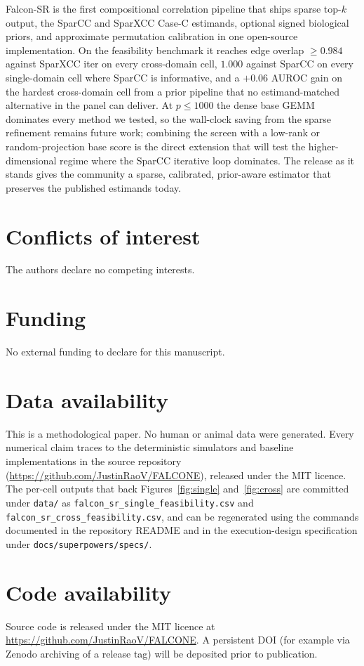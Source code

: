 \documentclass[unnumsec,webpdf,contemporary,large]{oup-authoring-template}
\newcommand{\codepath}[1]{\nolinkurl{#1}}
\theoremstyle{thmstyleone}
\theoremstyle{thmstyletwo}
\theoremstyle{thmstylethree}
\begin{document}
Falcon-SR is the first compositional correlation pipeline that ships
sparse top-$k$ output, the SparCC and SparXCC Case-C estimands,
optional signed biological priors, and approximate permutation
calibration in one open-source implementation. On the feasibility
benchmark it reaches edge overlap $\geq 0.984$ against SparXCC iter
on every cross-domain cell, $1.000$ against SparCC on every
single-domain cell where SparCC is informative, and a $+0.06$ AUROC
gain on the hardest cross-domain cell from a prior pipeline that no
estimand-matched alternative in the panel can deliver. At
$p \leq 1000$ the dense base GEMM dominates every method we tested,
so the wall-clock saving from the sparse refinement remains future
work; combining the screen with a low-rank or random-projection base
score is the direct extension that will test the higher-dimensional
regime where the SparCC iterative loop dominates. The release as it
stands gives the community a sparse, calibrated, prior-aware
estimator that preserves the published estimands today.

\section{Conflicts of interest}
The authors declare no competing interests.

\section{Funding}
No external funding to declare for this manuscript.

\section{Data availability}
This is a methodological paper. No human or animal data were
generated. Every numerical claim traces to the deterministic
simulators and baseline implementations in the source repository
(\url{https://github.com/JustinRaoV/FALCONE}), released under the
MIT licence. The per-cell outputs that back Figures~\ref{fig:single}
and~\ref{fig:cross} are committed under \codepath{data/} as
\codepath{falcon_sr_single_feasibility.csv} and
\codepath{falcon_sr_cross_feasibility.csv}, and can be regenerated
using the commands documented in the repository README and in the
execution-design specification under
\codepath{docs/superpowers/specs/}.

\section{Code availability}
Source code is released under the MIT licence at
\url{https://github.com/JustinRaoV/FALCONE}. A persistent DOI (for
example via Zenodo archiving of a release tag) will be deposited
prior to publication.
\end{document}
